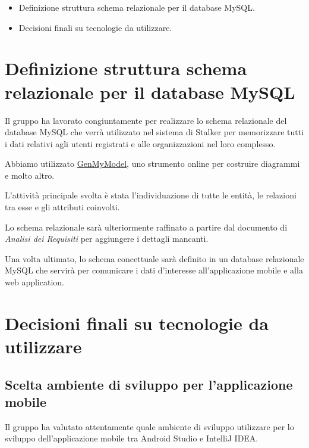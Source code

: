 \documentclass{article}
\begin{document}
\begin{itemize}
  \item Definizione struttura schema relazionale per il database MySQL\@.
  \item Decisioni finali su tecnologie da utilizzare.
\end{itemize}

\section{Definizione struttura schema relazionale per il database MySQL}%
\label{sec:definizione_struttura_schema_relazionale_per_il_database_MySQL}
Il gruppo ha lavorato congiuntamente per realizzare lo schema relazionale del database MySQL che verrà utilizzato nel sistema di Stalker per memorizzare tutti i dati relativi agli utenti registrati e alle organizzazioni nel loro complesso.

Abbiamo utilizzato \href{https://www.genmymodel.com/}{GenMyModel}, uno strumento online per costruire diagrammi e molto altro.

L'attività principale svolta è stata l'individuazione di tutte le entità, le relazioni tra esse e gli attributi coinvolti.

Lo schema relazionale sarà ulteriormente raffinato a partire dal documento di \textit{Analisi dei Requisiti} per aggiungere i dettagli mancanti.

Una volta ultimato, lo schema concettuale sarà definito in un database relazionale MySQL che servirà per comunicare i dati d'interesse all'applicazione mobile e alla web application.


\section{Decisioni finali su tecnologie da utilizzare}%
\label{sec:decisioni_finali}

\subsection{Scelta ambiente di sviluppo per l'applicazione mobile}%
\label{sub:scelta_ambiente_di_sviluppo_per_applicazione_mobile}
Il gruppo ha valutato attentamente quale ambiente di sviluppo utilizzare per lo sviluppo dell'applicazione mobile tra Android Studio e IntelliJ IDEA\@.
\end{document}
